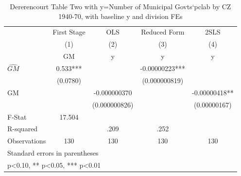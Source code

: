\begin{table}[htbp]\centering
\def\sym#1{\ifmmode^{#1}\else\(^{#1}\)\fi}
\caption{Dererencourt Table Two with y=Number of Municipal Govts`pclab by CZ 1940-70, with baseline y and division FEs}
\begin{tabular}{l*{4}{c}}
\toprule
                    & First Stage   &         OLS   &Reduced Form   &        2SLS   \\
                    &\multicolumn{1}{c}{(1)}&\multicolumn{1}{c}{(2)}&\multicolumn{1}{c}{(3)}&\multicolumn{1}{c}{(4)}\\
                    &\multicolumn{1}{c}{GM}&\multicolumn{1}{c}{y}&\multicolumn{1}{c}{y}&\multicolumn{1}{c}{y}\\
\midrule
$\hat{GM}$          &       0.533***&               & -0.00000223***&               \\
                    &    (0.0780)   &               &(0.000000819)   &               \\
\addlinespace
GM                  &               &-0.000000370   &               & -0.00000418** \\
                    &               &(0.000000826)   &               &(0.00000167)   \\
\midrule
F-Stat              &      17.504   &               &               &               \\
R-squared           &               &        .209   &        .252   &               \\
Observations        &         130   &         130   &         130   &         130   \\
\bottomrule
\multicolumn{5}{l}{\footnotesize Standard errors in parentheses}\\
\multicolumn{5}{l}{\footnotesize * p<0.10, ** p<0.05, *** p<0.01}\\
\end{tabular}
\end{table}
